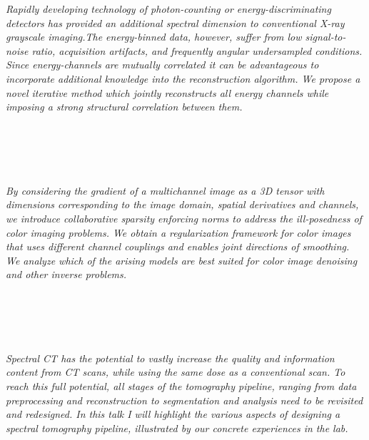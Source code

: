   \begin{multicols}{2}
      \textit{Rapidly developing technology of photon-counting or energy-discriminating detectors has provided an additional spectral dimension to conventional X-ray grayscale imaging.The energy-binned data, however, suffer from low signal-to-noise ratio, acquisition artifacts, and frequently angular undersampled conditions. Since energy-channels are mutually correlated it can be advantageous to incorporate additional knowledge into the reconstruction algorithm. We propose a novel iterative method which jointly reconstructs all energy channels while imposing a strong structural correlation between them.}\\
\\ 
        \\
        \\\\
\\
      \textit{By considering the gradient of a multichannel image as a 3D tensor with dimensions corresponding to the image domain, spatial derivatives and channels, we introduce collaborative sparsity enforcing norms to address the ill-posedness of color imaging problems. We obtain a regularization framework for color images that uses different channel couplings and enables joint directions of smoothing. We analyze which of the arising models are best suited for color image denoising and other inverse problems.}\\
\\ 
        \\
        \\\\
\\
      \textit{Spectral CT has the potential to vastly increase the quality and information content from CT scans, while using the same dose as a conventional scan.
To reach this full potential, all stages of the tomography pipeline, ranging from data preprocessing and reconstruction to segmentation and analysis need to be revisited and redesigned.
In this talk I will highlight the various aspects of designing a spectral tomography pipeline, illustrated by our concrete experiences in the lab.}\\
\\ 
        \\
        \\\\

\end{multicols}
